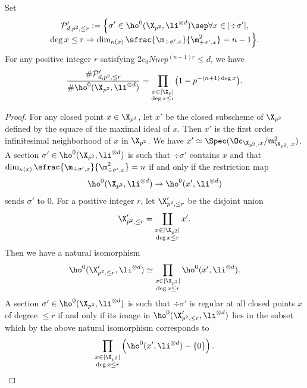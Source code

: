 \begin{lem}\label{smalldegree}
Set
\begin{multline*}
\mathcal{P}'_{d,p^2,\leq r}:=\Bigl\{ \sigma'\in \ho^0(\X_{p^2}, \li^{\otimes d})\sep \forall x\in |{\div\sigma'}|,\\[-5pt] \deg x\leq r\Rightarrow \dim_{\kappa(x)}\sfrac{\m_{\div \sigma',x}}{\m^2_{\div \sigma', x}}=n-1 \Bigr\}.
\end{multline*}
For any positive integer $r$ satisfying $2c_0Nnrp^{(n-1)r}\leq d$, we have
\[
\frac{\#\mathcal{P}'_{d,p^2,\leq r}}{\#\ho^0(\X_{p^2}, \li^{\otimes d})}=\prod_{\substack{x\in |\X_{p}|\\ \deg x\leq r}} \bigl(1-p^{-(n+1)\deg x} \bigr).
\]
\end{lem}
\begin{proof}
For any closed point $x\in \X_{p^2}$, let $x'$ be the closed subscheme of $\X_{p^2}$ defined by the square of the maximal ideal of $x$. Then $x'$ is the first order infinitesimal neighborhood of $x$ in $\X_{p^2}$. We have $x'\simeq \Spec (\Oc_{\X_{p^2,},x}/\mathfrak{m}_{\X_{p^2,},x}^2)$. A section $\sigma'\in \ho^0(\X_{p^2}, \li^{\otimes d})$ is such that $\div \sigma'$ contains $x$ and that $ \dim_{\kappa(x)}\sfrac{\m_{\div \sigma',x}}{\m^2_{\div \sigma', x}}=n$ if and only if the restriction map\vspace*{-3pt}
\[
\ho^0(\X_{p^2}, \li^{\otimes d}) \to \ho^0(x', \li^{\otimes d})
\]
sends $\sigma'$ to $0$. For a positive integer $r$, let $\X'_{p^2,\leq r}$ be the disjoint union\vspace*{-3pt}
\[
\X'_{p^2,\leq r}=\coprod_{\substack{x\in |\X_{p^2}|\\ \deg x\leq r}}x'.\]
Then we have a natural isomorphism\vspace*{-3pt}
\[
\ho^0(\X'_{p^2,\leq r}, \li^{\otimes d})\simeq \prod_{\substack{x\in |\X_{p^2}|\\ \deg x\leq r}}\ho^0(x', \li^{\otimes d}).
\]
A section $\sigma'\in \ho^0(\X_{p^2}, \li^{\otimes d})$ is such that $\div \sigma'$ is regular at all closed points $x$ of degree $\leq r$ if and only if its image in $\ho^0(\X'_{p^2,\leq r}, \li^{\otimes d})$ lies in the subset which by the above natural isomorphism corresponds to\vspace*{-3pt}
\[
\prod_{\substack{x\in |\X_{p^2}|\\ \deg x\leq r}}\left(\ho^0(x', \li^{\otimes d})-\{0\}\right).
\]


\end{proof}
